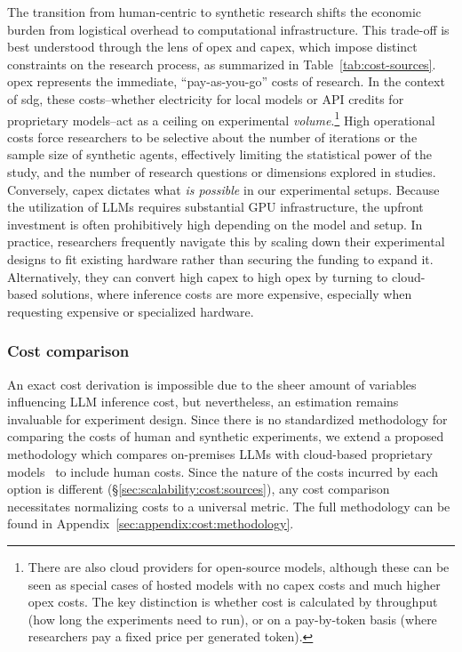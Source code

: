 The transition from human-centric to synthetic research shifts the economic burden from logistical overhead to computational infrastructure. This trade-off is best understood through the lens of \ac{opex} and \ac{capex}, which impose distinct constraints on the research process, as summarized in Table~\ref{tab:cost-sources}. \acf{opex} represents the immediate, ``pay-as-you-go'' costs of research. In the context of \ac{sdg}, these costs--whether electricity for local models or API credits for proprietary models--act as a ceiling on experimental \emph{volume}.\footnote{There are also cloud providers for open-source models, although these can be seen as special cases of hosted models with no \ac{capex} costs and much higher \ac{opex} costs. The key distinction is whether cost is calculated by throughput (how long the experiments need to run), or on a pay-by-token basis (where researchers pay a fixed price per generated token).} High operational costs force researchers to be selective about the number of iterations or the sample size of synthetic agents, effectively limiting the statistical power of the study, and the number of research questions or dimensions explored in studies. Conversely, \acf{capex} dictates what \emph{is possible} in our experimental setups. Because the utilization of LLMs requires substantial GPU infrastructure, the upfront investment is often prohibitively high depending on the model and setup. In practice, researchers frequently navigate this by scaling down their experimental designs to fit existing hardware rather than securing the funding to expand it. Alternatively, they can convert high \ac{capex} to high \ac{opex} by turning to cloud-based solutions, where inference costs are more expensive, especially when requesting expensive or specialized hardware.

\subsubsection{Cost comparison}
\label{sec:scalability:cost:calculation}


An exact cost derivation is impossible due to the sheer amount of variables influencing LLM inference cost, but nevertheless, an estimation remains invaluable for experiment design. Since there is no standardized methodology for comparing the costs of human and synthetic experiments, we extend a proposed methodology which compares on-premises LLMs with cloud-based proprietary models~\cite{pan2025_cost_benefit} to include human costs. Since the nature of the costs incurred by each option is different (\S\ref{sec:scalability:cost:sources}), any cost comparison necessitates normalizing costs to a universal metric. The full methodology can be found in Appendix~\ref{sec:appendix:cost:methodology}.

